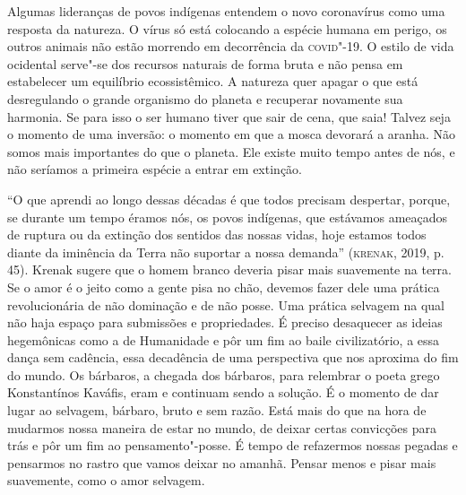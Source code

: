 Algumas lideranças de povos indígenas entendem o novo coronavírus como
uma resposta da natureza. O vírus só está colocando a espécie humana em
perigo, os outros animais não estão morrendo em decorrência da \textsc{covid}"-19.
O estilo de vida ocidental serve"-se dos recursos naturais de forma bruta
e não pensa em estabelecer um equilíbrio ecossistêmico. A natureza quer
apagar o que está desregulando o grande organismo do planeta e recuperar
novamente sua harmonia. Se para isso o ser humano tiver que sair de
cena, que saia! Talvez seja o momento de uma inversão: o momento em que
a mosca devorará a aranha. Não somos mais importantes do que o planeta.
Ele existe muito tempo antes de nós, e não seríamos a primeira espécie a
entrar em extinção.

``O que aprendi ao longo dessas décadas é que todos precisam despertar,
porque, se durante um tempo éramos nós, os povos indígenas, que
estávamos ameaçados de ruptura ou da extinção dos sentidos das nossas
vidas, hoje estamos todos diante da iminência da Terra não suportar a
nossa demanda'' (\textsc{krenak}, 2019, p. 45). Krenak sugere que o homem branco
deveria pisar mais suavemente na terra. Se o amor é o jeito como a gente
pisa no chão, devemos fazer dele uma prática revolucionária de não
dominação e de não posse. Uma prática selvagem na qual não haja espaço
para submissões e propriedades. É preciso desaquecer as ideias
hegemônicas como a de Humanidade e pôr um fim ao baile civilizatório, a
essa dança sem cadência, essa decadência de uma perspectiva que nos
aproxima do fim do mundo. Os bárbaros, a chegada dos bárbaros, para
relembrar o poeta grego Konstantínos Kaváfis, eram e continuam sendo a
solução. É o momento de dar lugar ao selvagem, bárbaro, bruto e sem
razão. Está mais do que na hora de mudarmos nossa maneira de estar no
mundo, de deixar certas convicções para trás e pôr um fim ao
pensamento"-posse. É tempo de refazermos nossas pegadas e pensarmos no
rastro que vamos deixar no amanhã. Pensar menos e pisar mais suavemente,
como o amor selvagem.


